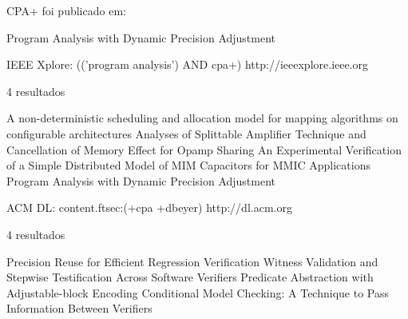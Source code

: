 CPA+ foi publicado em:

Program Analysis with Dynamic Precision Adjustment


IEEE Xplore: (('program analysis') AND cpa+)
http://ieeexplore.ieee.org

4 resultados

A non-deterministic scheduling and allocation model for mapping algorithms on configurable architectures
Analyses of Splittable Amplifier Technique and Cancellation of Memory Effect for Opamp Sharing
An Experimental Verification of a Simple Distributed Model of MIM Capacitors for MMIC Applications
Program Analysis with Dynamic Precision Adjustment

ACM DL: content.ftsec:(+cpa +dbeyer)
http://dl.acm.org

4 resultados

Precision Reuse for Efficient Regression Verification
Witness Validation and Stepwise Testification Across Software Verifiers
Predicate Abstraction with Adjustable-block Encoding
Conditional Model Checking: A Technique to Pass Information Between Verifiers
